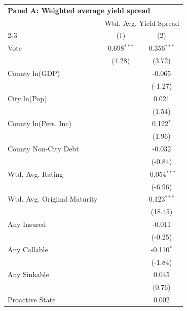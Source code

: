 \begingroup
\centering
\begin{tabular*}{\textwidth}{@{\extracolsep{\fill}}lcc}
\multicolumn{3}{l}{\textbf{Panel A: Weighted average yield spread}}\\

\addlinespace
   \toprule
    & \multicolumn{2}{c}{Wtd. Avg. Yield Spread}\\
   \cmidrule(lr){2-3}
                               & (1)           & (2)\\  
   \midrule 
   Vote                        & 0.698$^{***}$ & 0.356$^{***}$\\   
                               & (4.28)       & (3.72)\\   
   County ln(GDP)              &               & -0.065\\   
                               &               & (-1.27)\\   
   City ln(Pop)                &               & 0.021\\   
                               &               & (1.54)\\   
   County ln(Pers. Inc)        &               & 0.122$^{*}$\\   
                               &               & (1.96)\\   
   County Non-City Debt        &               & -0.032\\   
                               &               & (-0.84)\\   
   Wtd. Avg. Rating            &               & -0.054$^{***}$\\   
                               &               & (-6.96)\\   
   Wtd. Avg. Original Maturity &               & 0.123$^{***}$\\   
                               &               & (18.45)\\   
   Any Insured                 &               & -0.011\\   
                               &               & (-0.25)\\   
   Any Callable                &               & -0.110$^{*}$\\   
                               &               & (-1.84)\\   
   Any Sinkable                &               & 0.045\\   
                               &               & (0.76)\\   
   Proactive State             &               & 0.002\\   

\end{tabular*}
